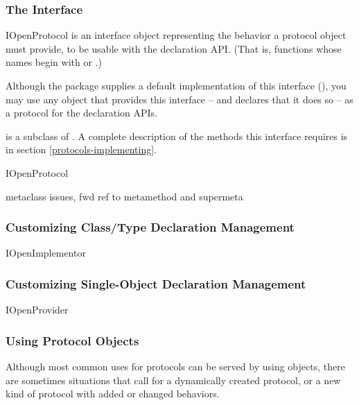 \begin{verbatim%
}
\begin{verbatim%
}
\begin{verbatim%
}
\begin{verbatim%
}
\subsubsection{The  Interface \label{open-protocols}}

\begin{classdesc*}{IOpenProtocol}
 is an interface object representing the behavior a
protocol object must provide, to be usable with the 
declaration API.  (That is, functions whose names begin with 
or .)

Although the  package supplies a default implementation of
this interface (), you may use any object that
provides this interface -- and declares that it does so -- as a protocol for
the declaration APIs.

 is a subclass of .  A complete
description of the methods this interface requires is in section
\ref{protocols-implementing}.
\end{classdesc*}

IOpenProtocol

metaclass issues, fwd ref to metamethod and supermeta

















\subsubsection{Customizing Class/Type Declaration Management}

IOpenImplementor

\subsubsection{Customizing Single-Object Declaration Management}

IOpenProvider

\subsubsection{Using Protocol Objects}
Although most common uses for protocols can be served by using 
objects, there are sometimes situations that call for a dynamically created
protocol, or a new kind of protocol with added or changed behaviors.


\end{verbatim%
}
\end{verbatim%
}
\end{verbatim%
}
\end{verbatim%
}
